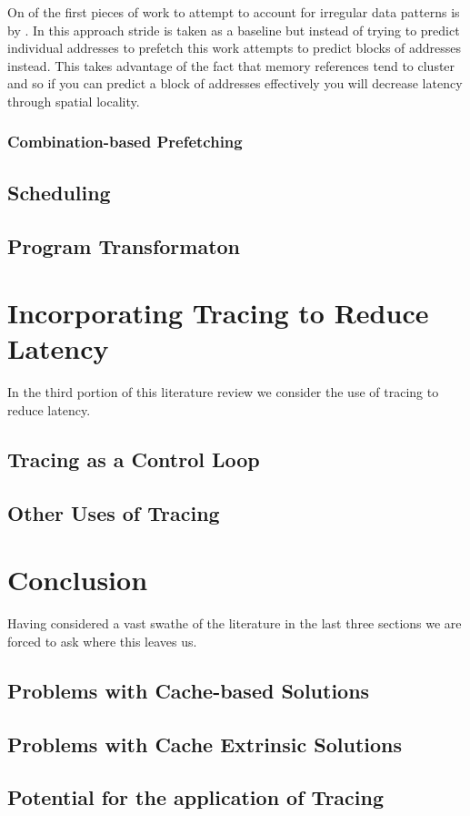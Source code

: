 On of the first pieces of work to attempt to account for irregular data patterns is by \citet{alexanderDistributedPrefetchbufferCache1996}. In this approach stride is taken as a baseline but instead of trying to predict individual addresses to prefetch this work attempts to predict blocks of addresses instead. This takes advantage of the fact that memory references tend to cluster and so if you can predict a block of addresses effectively you will decrease latency through spatial locality. \citet{rothDependenceBasedPrefetching1998}

\subsubsection{Combination-based Prefetching}

\subsection{Scheduling}

\subsection{Program Transformaton}

\section{Incorporating Tracing to Reduce Latency}

In the third portion of this literature review we consider the use of tracing to reduce latency.

\subsection{Tracing as a Control Loop}

\subsection{Other Uses of Tracing}

\section{Conclusion}

Having considered a vast swathe of the literature in the last three sections we are forced to ask where this leaves us.

\subsection{Problems with Cache-based Solutions}

\subsection{Problems with Cache Extrinsic Solutions}

\subsection{Potential for the application of Tracing}

